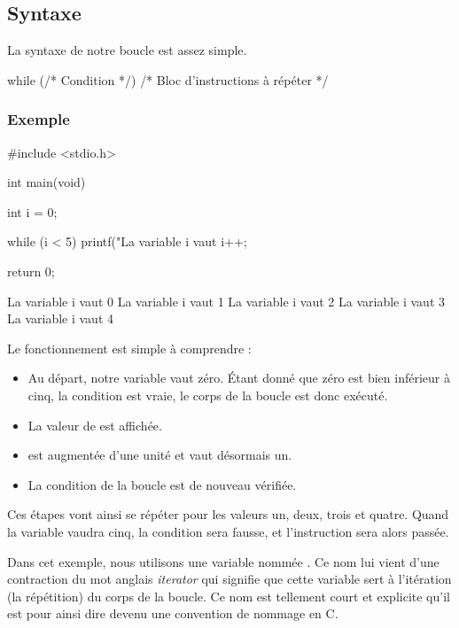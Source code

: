 \subsection{Syntaxe}
\label{syntaxe-1}

La syntaxe de notre boucle  est assez simple.

\begin{C}
while (/* Condition */)
{
    /* Bloc d'instructions à répéter */ 
}
\end{C}

\subsubsection{Exemple}
\label{exemple-5}

\begin{C}
#include <stdio.h>


int main(void)
{
    int i = 0;

    while (i < 5)
    {
        printf("La variable i vaut %
        i++;
    }

    return 0;
}
\end{C}

\begin{C}
La variable i vaut 0
La variable i vaut 1
La variable i vaut 2
La variable i vaut 3
La variable i vaut 4
\end{C}

Le fonctionnement est simple à comprendre :

\begin{itemize}
\item
  Au départ, notre variable  vaut zéro. Étant donné que zéro
  est bien inférieur à cinq, la condition est vraie, le corps de la
  boucle est donc exécuté.
\item
  La valeur de  est affichée.
\item
   est augmentée d'une unité et vaut désormais un.
\item
  La condition de la boucle est de nouveau vérifiée.
\end{itemize}

Ces étapes vont ainsi se répéter pour les valeurs un, deux, trois et
quatre. Quand la variable  vaudra cinq, la condition sera
fausse, et l'instruction  sera alors passée.

\begin{infobox}
  Dans cet exemple, nous utilisons une
variable nommée . Ce nom lui vient d'une contraction du mot
anglais \emph{iterator} qui signifie que cette variable sert à
l'itération (la répétition) du corps de la boucle. Ce nom est tellement
court et explicite qu'il est pour ainsi dire devenu une convention de
nommage en C.
\end{infobox}

